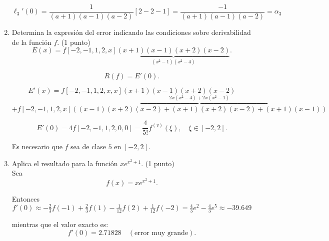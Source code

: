 \documentclass[12pt]{article}
\begin{document}
\begin{ejercicio}[4 puntos]
\begin{enumerate}
        \[
        \ell_3'(0) = \frac{1}{(a+1)(a-1)(a-2)} \left[ 2 - 2 - 1 \right] = \boxed{\frac{-1}{(a+1)(a-1)(a-2)} = \alpha_3}
        \]


        \item Determina la expresión del error indicando las condiciones sobre derivabilidad de la función \( f \). (1 punto) \\
        
        \[
        E(x) = f[-2,-1,1,2,x]\underbrace{(x+1)(x-1)(x+2)(x-2)}_{(x^2-1)(x^2-4)}.
        \]

        \[
        R(f) = E'(0).
        \]

        $$
        E'(x) = f[-2,-1,1,2,x,x] (x+1)(x-1)(x+2)(x-2)$$
        $$
        + f[-2,-1,1,2,x] \overbrace{\left((x-1)(x+2)(x-2) + (x+1)(x+2)(x-2) + (x+1)(x-1) \right)}^{2x(x^2-4) + 2x(x^2-1)}
        $$

        \[
        E'(0) = 4 f[-2,-1,1,2,0,0] = \frac{4}{5!} f^{(v)}(\xi), \quad \xi \in [-2,2].
        \]

        Es necesario que $f$ sea de clase $5$ en $[-2,2]$.

        \item Aplica el resultado para la función $xe^{x^2 + 1}$. (1 punto) \\
      
        Sea
        \[
        f(x) = x e^{x^2+1}.
        \]

        Entonces
        \[
        f'(0) \approx -\tfrac{2}{3} f(-1) + \tfrac{2}{3} f(1) - \tfrac{1}{12} f(2) + \tfrac{1}{12} f(-2) = \tfrac{4}{3} e^2 - \tfrac{4}{3} e^5 \approx -39\text{.}649
        \]

        mientras que el valor exacto es:
        \[
        f'(0) = 2.71828 \quad (\text{error muy grande}).
        \]
      \end{enumerate}
    \end{ejercicio}
\end{document}

